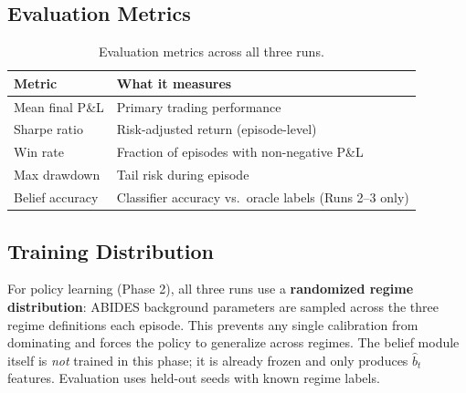 \documentclass[11pt]{article}
\begin{document}
\subsection{Evaluation Metrics}

\begin{table}[h]
\centering
\begin{tabular}{ll}
\toprule
\textbf{Metric} & \textbf{What it measures} \\
\midrule
Mean final P\&L & Primary trading performance \\
Sharpe ratio & Risk-adjusted return (episode-level) \\
Win rate & Fraction of episodes with non-negative P\&L \\
Max drawdown & Tail risk during episode \\
Belief accuracy & Classifier accuracy vs.\ oracle labels (Runs 2--3 only) \\
\bottomrule
\end{tabular}
\caption{Evaluation metrics across all three runs.}
\end{table}

\subsection{Training Distribution}

For policy learning (Phase 2), all three runs use a \textbf{randomized regime distribution}:
ABIDES background parameters are sampled across the three regime definitions each episode. This
prevents any single calibration from dominating and forces the policy to generalize across regimes.
The belief module itself is \emph{not} trained in this phase; it is already frozen and only produces
$\hat{b}_t$ features. Evaluation uses held-out seeds with known regime labels.
\end{document}
